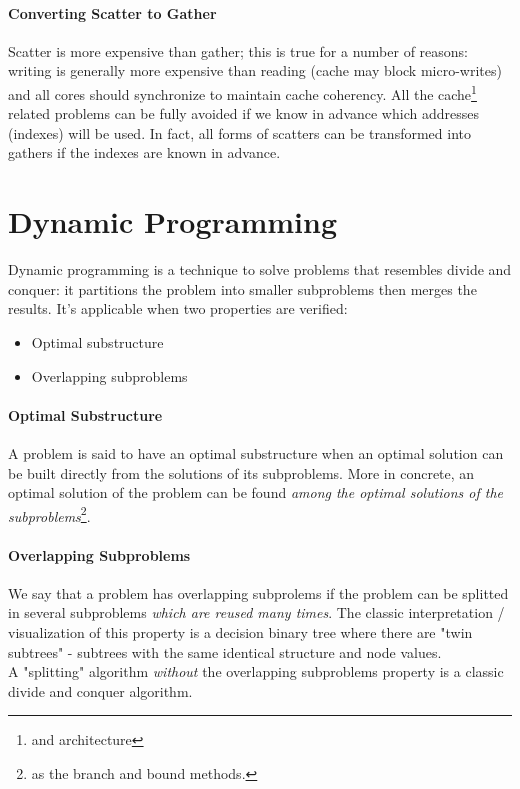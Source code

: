 \documentclass{article}
\begin{document}
				\paragraph{Converting Scatter to Gather}
					Scatter is more expensive than gather; this is true for a number of reasons: writing is generally more expensive than reading (cache may block micro-writes) and all cores should synchronize to maintain cache coherency. All the cache\footnote{and architecture} related problems can be fully avoided if we know in advance which addresses (indexes) will be used. In fact, all forms of scatters can be transformed into gathers if the indexes are known in advance.
				
	\section{Dynamic Programming}
		Dynamic programming is a technique to solve problems that resembles divide and conquer: it partitions the problem into smaller subproblems then merges the results. It's applicable when two properties are verified:
		\begin{itemize}
			\item Optimal substructure
			\item Overlapping subproblems
		\end{itemize}

		\paragraph{Optimal Substructure}
			A problem is said to have an optimal substructure when an optimal solution can be built directly from the solutions of its subproblems. More in concrete, an optimal solution of the problem can be found \textit{among the optimal solutions of the subproblems}\footnote{as the branch and bound methods.}. 
		
		\paragraph{Overlapping Subproblems}
			We say that a problem has overlapping subprolems if the problem can be splitted in several subproblems \textit{which are reused many times}. The classic interpretation / visualization of this property is a decision binary tree where there are "twin subtrees" - subtrees with the same identical structure and node values.\\
			A "splitting" algorithm \textit{without} the overlapping subproblems property is a classic divide and conquer algorithm.
\end{document}
